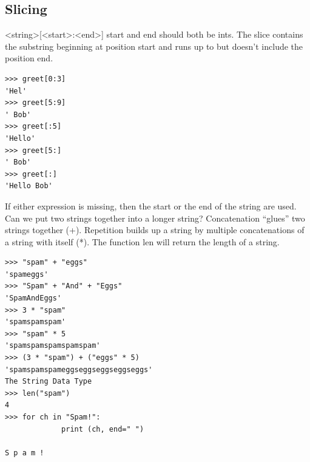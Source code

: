 \documentclass[12pt,a4paper,final,twoside,titlepage]{book}
\begin{document}
\subsection{Slicing}
<string>[<start>:<end>]
start and end should both be ints. The slice contains the substring beginning at position start and runs up to but doesn’t include the position end.
\begin{lstlisting}
>>> greet[0:3]
'Hel'
>>> greet[5:9]
' Bob'
>>> greet[:5]
'Hello'
>>> greet[5:]
' Bob'
>>> greet[:]
'Hello Bob'
\end{lstlisting}
If either expression is missing, then the start or the end of the string are used. Can we put two strings together into a longer string? Concatenation “glues” two strings together (+). Repetition builds up a string by multiple concatenations of a string with itself (*). The function len will return the length of a string.
\begin{lstlisting}
>>> "spam" + "eggs"
'spameggs'
>>> "Spam" + "And" + "Eggs"
'SpamAndEggs'
>>> 3 * "spam"
'spamspamspam'
>>> "spam" * 5
'spamspamspamspamspam'
>>> (3 * "spam") + ("eggs" * 5)
'spamspamspameggseggseggseggseggs'
The String Data Type
>>> len("spam")
4
>>> for ch in "Spam!":
	         print (ch, end=" ")
	
S p a m !
\end{lstlisting}
\end{document}
